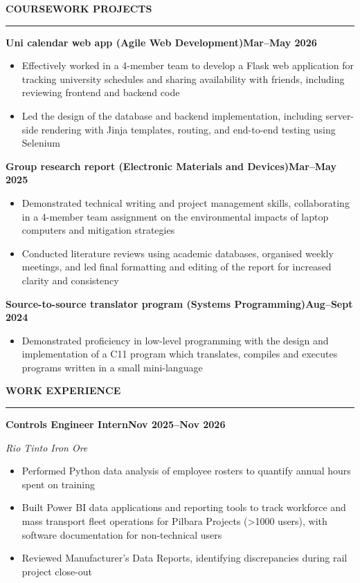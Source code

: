 \documentclass[11pt,a4paper]{article}
\newcommand{\cvsection}[1]{%
    \vspace{3pt}
    \noindent\textbf{\MakeUppercase{#1}}\par
    \vspace{4pt}
    \hrule
    \vspace{3pt}
}
\newcommand{\cvitemshort}[2]{%
    \noindent\textbf{#1}\hfill\textbf{#2}
}
\newcommand{\cvitemlong}[3]{%
    \noindent\textbf{#1}\hfill\textbf{#2}\par\textit{#3}
}
\begin{document}
\cvsection{Coursework Projects}

\cvitemshort%
    {Uni calendar web app (Agile Web Development)}%
    {Mar--May 2026} %

\begin{itemize}
    \item Effectively worked in a 4-member team to develop a Flask web application for tracking university schedules and sharing availability with friends, including reviewing frontend and backend code
    \item Led the design of the database and backend implementation, including server-side rendering with Jinja templates, routing, and end-to-end testing using Selenium
\end{itemize}

\cvitemshort%
    {Group research report (Electronic Materials and Devices)}%
    {Mar--May 2025} %

\begin{itemize}
    \item Demonstrated technical writing and project management skills, collaborating in a 4-member team assignment on the environmental impacts of laptop computers and mitigation strategies
    \item Conducted literature reviews using academic databases, organised weekly meetings, and led final formatting and editing of the report for increased clarity and consistency
\end{itemize}

\cvitemshort%
    {Source-to-source translator program (Systems Programming)}%
    {Aug--Sept 2024} %

\begin{itemize}
    \item Demonstrated proficiency in low-level programming with the design and implementation of a C11 program which translates, compiles and executes programs written in a small mini-language
\end{itemize}


\cvsection{Work Experience}

\cvitemlong%
    {Controls Engineer Intern}%
    {Nov 2025--Nov 2026}%
    {Rio Tinto Iron Ore}

\begin{itemize}
    \item Performed Python data analysis of employee rosters to quantify annual hours spent on training
    \item Built Power BI data applications and reporting tools to track workforce and mass transport fleet operations for Pilbara Projects (\textgreater{}1000 users), with software documentation for non-technical users
    \item Reviewed Manufacturer's Data Reports, identifying discrepancies during rail project close-out
\end{itemize}
\end{document}
